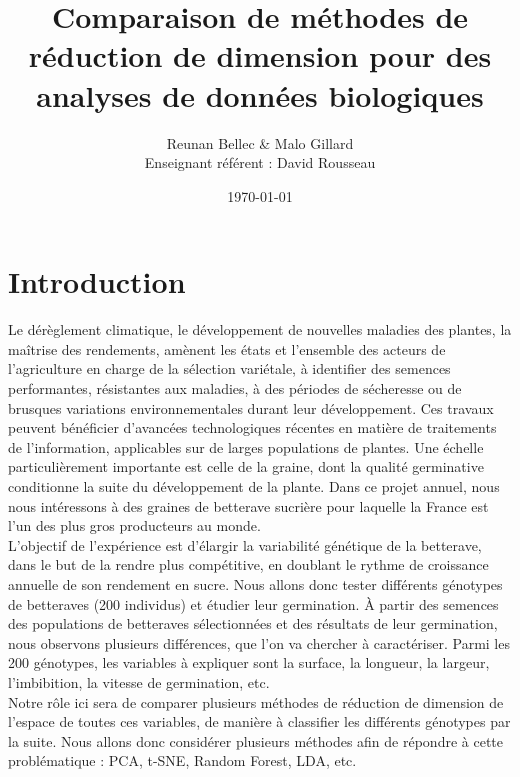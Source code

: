 \documentclass[12pt]{report}
\title{\textbf{Comparaison de méthodes de réduction de dimension pour des analyses de données biologiques}}
\author{Reunan Bellec \& Malo Gillard \\ Enseignant référent : David Rousseau}
\date{\today} %
\begin{document}
\maketitle

\tableofcontents

\thispagestyle{empty} %

\chapter*{Introduction}

Le dérèglement climatique, le développement de nouvelles maladies des plantes, la maîtrise des rendements, amènent les états et l’ensemble des acteurs de l’agriculture en charge de la sélection variétale, à identifier des semences performantes, résistantes aux maladies, à des périodes de sécheresse ou de brusques variations environnementales durant leur développement. Ces travaux peuvent bénéficier d’avancées technologiques récentes en matière de traitements de l’information, applicables sur de larges populations de plantes. Une échelle particulièrement importante est celle de la graine, dont la qualité germinative conditionne la suite du développement de la plante. Dans ce projet annuel, nous nous intéressons à des graines de betterave sucrière pour laquelle la France est l’un des plus gros producteurs au monde.\\


L'objectif de l'expérience est d'élargir la variabilité génétique de la betterave, dans le but de la rendre plus compétitive, en doublant le rythme de croissance annuelle de son rendement en sucre.
Nous allons donc tester différents génotypes de betteraves (200 individus) et étudier leur germination.
À partir des semences des populations de betteraves sélectionnées et des résultats de leur germination, nous observons plusieurs différences, que l'on va chercher à caractériser. Parmi les 200 génotypes, les variables à expliquer sont la surface, la longueur, la largeur, l'imbibition, la vitesse de germination, etc.\\

Notre rôle ici sera de comparer plusieurs méthodes de réduction de dimension de l'espace de toutes ces variables, de manière à classifier les différents génotypes par la suite.
Nous allons donc considérer plusieurs méthodes afin de répondre à cette problématique : PCA, t-SNE, Random Forest, LDA, etc.\\
\end{document}
